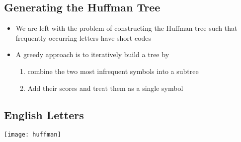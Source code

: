 
\begin{slide}
\section[-2.5]{Generating the Huffman Tree}

\pausebuild
\color{TwoColor}
\begin{itemize}\squeeze
\item We are left with the problem of constructing the Huffman tree
  such that frequently occurring letters have short codes\pauseh
\item A greedy approach is to iteratively build a tree by\pauseh
  \begin{enumerate}
  \item combine the two most infrequent symbols into a subtree\pauseh
  \item Add their scores and treat them as a single symbol\pauseh
  \end{enumerate}
  \begin{center}
    \pause
  \end{center}
\end{itemize}


\end{slide}


\begin{slide}
\section[-2]{English Letters}
\begin{center}
  \texttt{[image: huffman]}
\end{center}
\end{slide}


